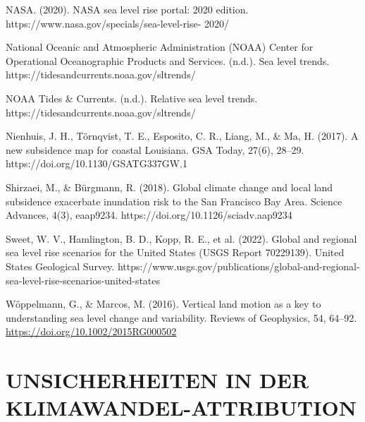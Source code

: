 \documentclass[12pt,paper=a4,DIV=12,parskip=never,chapterprefix=false,headings=standardclasses]{scrreprt}
\newcommand{\FigureNumbersByChapter}{%
  \counterwithout{figure}{section}%
  \counterwithin{figure}{chapter}%
}
\begin{document}
NASA. (2020). NASA sea level rise portal: 2020 edition. https://www.nasa.gov/specials/sea-level-rise-
2020/

National Oceanic and Atmospheric Administration (NOAA) Center for Operational Oceanographic
Products and Services. (n.d.). Sea level trends. https://tidesandcurrents.noaa.gov/sltrends/

NOAA Tides \& Currents. (n.d.). Relative sea level trends. https://tidesandcurrents.noaa.gov/sltrends/

Nienhuis, J. H., Törnqvist, T. E., Esposito, C. R., Liang, M., \& Ma, H. (2017). A new subsidence map for
coastal Louisiana. GSA Today, 27(6), 28–29. https://doi.org/10.1130/GSATG337GW.1

Shirzaei, M., \& Bürgmann, R. (2018). Global climate change and local land subsidence exacerbate
inundation risk to the San Francisco Bay Area. Science Advances, 4(3), eaap9234.
https://doi.org/10.1126/sciadv.aap9234

Sweet, W. V., Hamlington, B. D., Kopp, R. E., et al. (2022). Global and regional sea level rise scenarios
for the United States (USGS Report 70229139). United States Geological Survey.
https://www.usgs.gov/publications/global-and-regional-sea-level-rise-scenarios-united-states

Wöppelmann, G., \& Marcos, M. (2016). Vertical land motion as a key to understanding sea level change
and variability. Reviews of Geophysics, 54, 64–92. \url{https://doi.org/10.1002/2015RG000502}

\endgroup

\cleardoublepage
\FigureNumbersByChapter 
\chapter{UNSICHERHEITEN IN DER KLIMAWANDEL-ATTRIBUTION}
\end{document}
